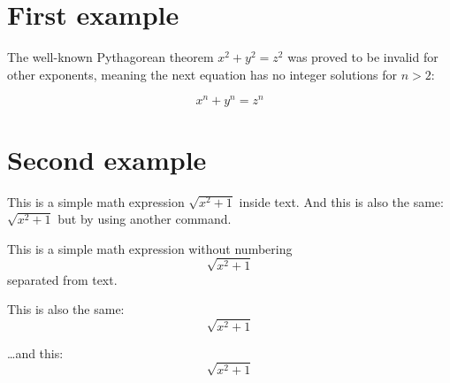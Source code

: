 \documentclass{article}
\begin{document}
	\section{First example}
	
	The well-known Pythagorean theorem \(x^2 + y^2 = z^2\) was proved to be invalid for other exponents, meaning the next equation has no integer solutions for \(n>2\):
	
	\[ x^n + y^n = z^n \]
	
	\section{Second example}
	
	This is a simple math expression \(\sqrt{x^2+1}\) inside text. 
	And this is also the same: 
	\begin{math}
		\sqrt{x^2+1}
	\end{math}
	but by using another command.
	
	This is a simple math expression without numbering
	\[\sqrt{x^2+1}\] 
	separated from text.
	
	This is also the same:
	\begin{displaymath}
		\sqrt{x^2+1}
	\end{displaymath}
	
	\ldots and this:
	\begin{equation*}
		\sqrt{x^2+1}
	\end{equation*}
\end{document}
